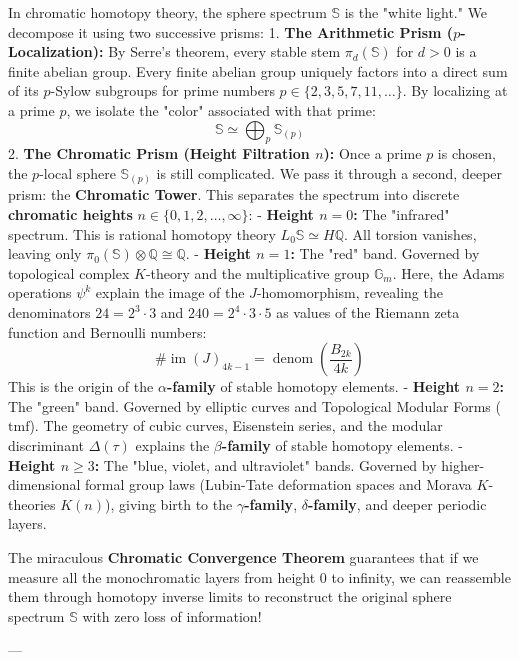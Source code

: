 \documentclass[11pt,twoside,openright]{amsbook}
\begin{document}
{{In chromatic homotopy theory, the sphere spectrum $\mathbb{S}$ is the "white light." We decompose it using two successive prisms:
1. \textbf{The Arithmetic Prism ($p$-Localization):} By Serre's theorem, every stable stem $\pi_d(\mathbb{S})$ for $d > 0$ is a finite abelian group. Every finite abelian group uniquely factors into a direct sum of its $p$-Sylow subgroups for prime numbers $p \in \{2, 3, 5, 7, 11, \dots\}$. By localizing at a prime $p$, we isolate the "color" associated with that prime:
   $$\mathbb{S} \simeq \bigoplus_p \mathbb{S}_{(p)}$$
2. \textbf{The Chromatic Prism (Height Filtration $n$):} Once a prime $p$ is chosen, the $p$-local sphere $\mathbb{S}_{(p)}$ is still complicated. We pass it through a second, deeper prism: the \textbf{Chromatic Tower}. This separates the spectrum into discrete \textbf{chromatic heights} $n \in \{0, 1, 2, \dots, \infty\}$:
   - \textbf{Height $n=0$:} The "infrared" spectrum. This is rational homotopy theory $L_0 \mathbb{S} \simeq H\mathbb{Q}$. All torsion vanishes, leaving only $\pi_0(\mathbb{S}) \otimes \mathbb{Q} \cong \mathbb{Q}$.
   - \textbf{Height $n=1$:} The "red" band. Governed by topological complex $K$-theory and the multiplicative group $\mathbb{G}_m$. Here, the Adams operations $\psi^k$ explain the image of the $J$-homomorphism, revealing the denominators $24 = 2^3 \cdot 3$ and $240 = 2^4 \cdot 3 \cdot 5$ as values of the Riemann zeta function and Bernoulli numbers:
     $$\# \operatorname{im}(J)_{4k-1} = \operatorname{denom}\left( \frac{B_{2k}}{4k} \right)$$
     This is the origin of the \textbf{$\alpha$-family} of stable homotopy elements.
   - \textbf{Height $n=2$:} The "green" band. Governed by elliptic curves and Topological Modular Forms ($\mathrm{tmf}$). The geometry of cubic curves, Eisenstein series, and the modular discriminant $\Delta(\tau)$ explains the \textbf{$\beta$-family} of stable homotopy elements.
   - \textbf{Height $n \geq 3$:} The "blue, violet, and ultraviolet" bands. Governed by higher-dimensional formal group laws (Lubin-Tate deformation spaces and Morava $K$-theories $K(n)$), giving birth to the \textbf{$\gamma$-family}, \textbf{$\delta$-family}, and deeper periodic layers.

The miraculous \textbf{Chromatic Convergence Theorem} guarantees that if we measure all the monochromatic layers from height 0 to infinity, we can reassemble them through homotopy inverse limits to reconstruct the original sphere spectrum $\mathbb{S}$ with zero loss of information!

---

}}
\end{document}
